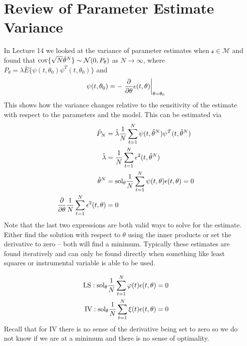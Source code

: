 
\mainmatter
\setcounter{page}{1}

\lectureseries[\course]{\course}

\date{November 17, 2009}

\setaddress

\setcounter{lecture}{14}
\setcounter{chapter}{14}


\section{Review of Parameter Estimate Variance}
In Lecture 14 we looked at the variance of parameter estimates when $\mathcal{s}\in\mathcal{M}$ and found that $\text{cov}\{\sqrt{N}\hat{\theta}^N\} \sim \mathcal{N}(0,P_\theta)$ as $N\to\infty$, where $P_\theta = \lambda\bar{E}\{\psi(t,\theta_0)\psi^T(t,\theta_0)\}$ and
$$\psi(t,\theta_0) = -\left.\frac{\partial}{\partial\theta}\epsilon(t,\theta)\right|_{\theta=\theta_0}$$
This shows how the variance changes relative to the sensitivity of the estimate with respect to the parameters and the model. This can be estimated via
\begin{align*}
\hat{P}_N &= \hat{\lambda}\frac{1}{N}\sum_{t=1}^N\psi(t,\hat{\theta}^N)\psi^T(t,\hat{\theta}^N) \\
\hat{\lambda} &= \frac{1}{N}\sum_{t=1}^N\epsilon^2(t,\hat{\theta}^N) \\
\hat{\theta}^N &= \text{sol}_\theta\frac{1}{N}\sum_{t=1}^N\psi(t,\theta)\epsilon(t,\theta) = 0 \\
\frac{\partial}{\partial\theta}\frac{1}{N}\sum_{t=1}^N\epsilon^2(t,\theta) &= 0
\end{align*}
Note that the last two expressions are both valid ways to solve for the estimate. Either find the solution with respect to $\theta$ using the inner products or set the derivative to zero -- both will find a minimum. Typically these estimates are found iteratively and can only be found directly when something like least squares or instrumental variable is able to be used.

\begin{align*}
\text{LS}: \text{sol}_\theta \frac{1}{N}\sum_{t=1}^N\varphi(t)\epsilon(t,\theta) = 0 \\
\text{IV}: \text{sol}_\theta \frac{1}{N}\sum_{t=1}^N\xi(t)\epsilon(t,\theta) = 0
\end{align*}
Recall that for IV there is no sense of the derivative being set to zero so we do not know if we are at a minimum and there is no sense of optimality.

